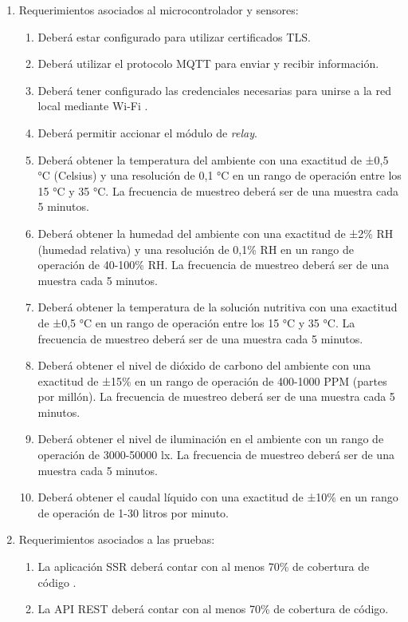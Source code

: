 \begin{enumerate}
	\item Requerimientos asociados al microcontrolador y sensores:
		\begin{enumerate}
			\item Deberá estar configurado para utilizar certificados TLS.
			\item Deberá utilizar el protocolo MQTT para enviar y recibir información.
		    \item Deberá tener configurado las credenciales necesarias para unirse a la red local mediante Wi-Fi  \citep{WEBSITE:WIFI}.
			\item Deberá permitir accionar el módulo de \textit{relay}.
			\item Deberá obtener la temperatura del ambiente con una exactitud de ±0,5 °C (Celsius) y una resolución de 0,1 °C en un rango de operación entre los 15 °C y 35 °C. La frecuencia de muestreo deberá ser de una muestra cada 5 minutos.
			\item Deberá obtener la humedad del ambiente con una exactitud de ±2{\%} RH (humedad relativa) y una resolución de 0,1{\%} RH en un rango de operación de 40-100{\%} RH. La frecuencia de muestreo deberá ser de una muestra cada 5 minutos.
			\item Deberá obtener la temperatura de la solución nutritiva con una exactitud de ±0,5 °C en un rango de operación entre los 15 °C y 35 °C. La frecuencia de muestreo deberá ser de una muestra cada 5 minutos.
			\item Deberá obtener el nivel de dióxido de carbono del ambiente con una exactitud de ±15{\%} en un rango de operación de 400-1000 PPM (partes por millón). La frecuencia de muestreo deberá ser de una muestra cada 5 minutos.
			\item Deberá obtener el nivel de iluminación en el ambiente con un rango de operación de 3000-50000 lx. La frecuencia de muestreo deberá ser de una muestra cada 5 minutos.
			\item Deberá obtener el caudal líquido con una exactitud de ±10{\%} en un rango de operación de 1-30 litros por minuto.
		\end{enumerate}	
		
	\item Requerimientos asociados a las pruebas:
		\begin{enumerate}
			\item La aplicación SSR deberá contar con al menos 70{\%} de cobertura de código \citep{WEBSITE:TESTCOVERAGE}.
			\item La API REST deberá contar con al menos 70{\%} de cobertura de código.
		\end{enumerate}					
\end{enumerate}

